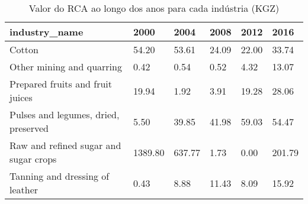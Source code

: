 \begin{table}
\centering
\caption{Valor do RCA ao longo dos anos para cada indústria (KGZ)}
\begin{tabular}{p{6cm}p{1.5cm}p{1.5cm}p{1.5cm}p{1.5cm}p{1.5cm}}
\toprule
                        industry\_name &    2000 &   2004 &  2008 &  2012 &   2016 \\
\midrule
                               Cotton &   54.20 &  53.61 & 24.09 & 22.00 &  33.74 \\
            Other mining and quarring &    0.42 &   0.54 &  0.52 &  4.32 &  13.07 \\
     Prepared fruits and fruit juices &   19.94 &   1.92 &  3.91 & 19.28 &  28.06 \\
 Pulses and legumes, dried, preserved &    5.50 &  39.85 & 41.98 & 59.03 &  54.47 \\
Raw and refined sugar and sugar crops & 1389.80 & 637.77 &  1.73 &  0.00 & 201.79 \\
      Tanning and dressing of leather &    0.43 &   8.88 & 11.43 &  8.09 &  15.92 \\
\bottomrule
\end{tabular}
\end{table}
